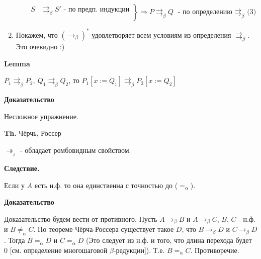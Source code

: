 \documentclass[12pt]{extreport}
\begin{document}
\begin{addmargin}[3em]{0}
\begin{enumerate}
\begin{enumerate}
                \begin{equation*}
                  \left.\begin{aligned}
                  S &\rightrightarrows_\beta S' \text{ - по предп. индукции} \\
                \end{aligned}\right\} \Rightarrow P \rightrightarrows_\beta Q \text{ - по определению $\rightrightarrows_\beta$ (3)}
                \end{equation*}
        \end{enumerate}
        \item Покажем, что $(\rightarrow_\beta)^* $ удовлетворяет всем условиям из определения $\rightrightarrows_\beta$. Это очевидно :)
    \end{enumerate}
    
    \end{addmargin}
\vspace{5mm}   
    
\noindent\textbf{Lemma}

    $P_1 \rightrightarrows_\beta P_2,\ Q_1 \rightrightarrows_\beta Q_2$, то $P_1[x := Q_1] \rightrightarrows_\beta P_2[x := Q_2]$

    \textbf{Доказательство}
    \begin{addmargin}[3em]{0}
  
    Несложное упражнение. 
    
    \end{addmargin}
\vspace{5mm}   

\noindent\textbf{Th.} Чёрчь, Россер
    
    $\twoheadrightarrow__\beta$ - обладает ромбовидным свойством.
    

\noindent\textbf{Следствие.} 

    Если у $A$ есть н.ф. то она единственна с точностью до ($=_\alpha$).
    
\textbf{Доказательство}
\begin{addmargin}[3em]{3cm}

Доказательство будем вести от противного. Пусть $A \rightarrow_\beta B$ и $A \rightarrow_\beta C$, $B$, $C$ - н.ф. и $B \not =_\alpha C$. По теореме Чёрча-Россера существует такое $D$, что $B \rightarrow_\beta D$ и $C \rightarrow_\beta D$. Тогда $B =_\alpha D$ и  $C =_\alpha D$ (Это следует из н.ф. и того, что длина перехода будет 0 [см. определение многошаговой $\beta$-редукции]). Т.е. $B =_\alpha C$. Противоречие. 
\end{addmargin}
\end{document}
